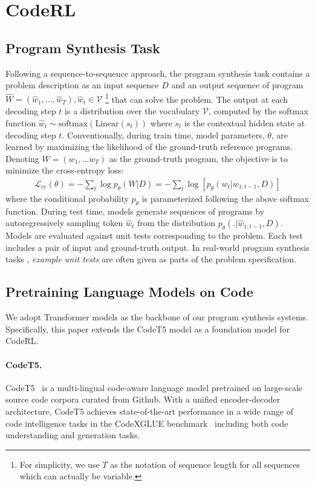 \documentclass{article}
\begin{document}
 
\section{CodeRL}
\label{sec:coderl}
\subsection{Program Synthesis Task}
Following a sequence-to-sequence approach, the program synthesis task contains a problem description as an input sequence $D$ and an output sequence of program $\hat{W}=(\hat{w}_1, ...,\hat{w}_T), \hat{w}_t \in \mathcal{V}$ \footnote{For simplicity, we use $T$ as the notation of sequence length for all sequences which can actually be variable.} that can solve the problem.
The output at each decoding step $t$ is a distribution over the vocabulary $\mathcal{V}$, computed by the softmax function $\hat{w}_t \sim \mathrm{softmax}(\mathrm{Linear}(s_{t}))$ where $s_{t}$ is the contextual hidden state at decoding step $t$.
Conventionally, during train time, model parameters, $\theta$, are learned by maximizing the likelihood of the ground-truth reference programs. Denoting $W=(w_1,...w_T)$ as the ground-truth program, the objective is to minimize the cross-entropy loss: 
\begin{align}
    \mathcal{L}_{ce}(\theta) = - \sum_t \log p_\theta(W|D) = - \sum_t \log [p_\theta (w_t | w_{1:t-1}, D)]
\end{align}
where the conditional probability $p_\theta$ is parameterized following the above softmax function. 
During test time, models generate sequences of programs by autoregressively sampling token $\hat{w}_t$ from the distribution $p_\theta (.| \hat{w}_{1:t-1}, D)$.
Models are evaluated against unit tests corresponding to the problem.
Each test includes a pair of input and ground-truth output. 
In real-world program synthesis tasks \citep{hendrycksapps2021}, \emph{example unit tests} are often given as parts of the problem specification.


\subsection{Pretraining Language Models on Code}
\label{subsec:pretrain_lm}

We adopt Transformer models as the backbone of our program synthesis systems. 
Specifically, this paper extends the CodeT5 model \citep{codet5} as a foundation model for CodeRL.

\paragraph{CodeT5.}
CodeT5~\citep{codet5} is a multi-lingual code-aware language model pretrained on large-scale source code corpora curated from Github. 
With a unified encoder-decoder architecture, CodeT5 achieves state-of-the-art performance in  a wide range of code intelligence tasks in the CodeXGLUE benchmark~\citep{codexglue}  including both code understanding and generation tasks. 
\end{document}
